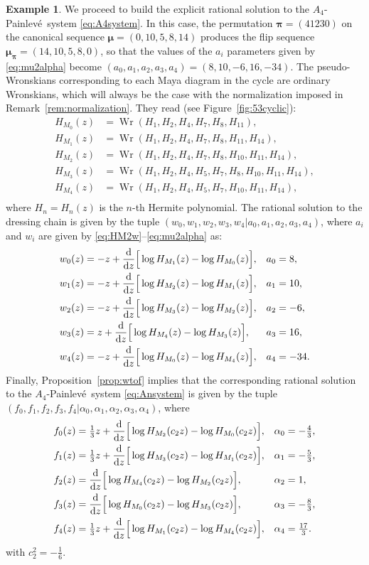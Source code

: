 \documentclass[10pt]{amsart}
\theoremstyle{definition}
\newtheorem{example}[thm]{Example}
\numberwithin{equation}{section}
\numberwithin{figure}{section}
\newcommand{\Wr}{\operatorname{Wr}}
\newcommand{\bmu}{{\boldsymbol{\mu}}}
\newcommand{\bpi}{{\boldsymbol{\pi}}}
\renewcommand{\H}{H}%
\newcommand{\ddz}{\frac{{\rm d}}{{\rm d}z}}
\newcommand{\p}{Painlev\'{e}}
\renewcommand{\a}{\alpha}
\newcommand{\cc}[1]{c_{#1}}
\begin{document}
\begin{example}
We proceed to build the explicit rational solution to the $A_4$-\p\ system \eqref{eq:A4system}. In this case, the permutation $\bpi=(41230)$ on the canonical sequence $\bmu=(0,10,5,8,14)$ produces the flip sequence $\bmu_\bpi=(14,10,5,8,0)$, so that the values of the $a_i$ parameters given by \eqref{eq:mu2alpha} become %
$(a_0,a_1,a_2,a_3,a_4)=(8,10,-6,16,-34)$.
The pseudo-Wronskians corresponding to each Maya diagram in the cycle are ordinary Wronskians, which will always be the case with the normalization imposed in Remark~\ref{rem:normalization}. They read (see Figure~\ref{fig:53cyclic}):
\begin{align*}
\H_{M_0}(z)&=\Wr(H_1,H_2,H_4,H_7,H_8,H_{11}),\\
\H_{M_1}(z)&=\Wr(H_1,H_2,H_4,H_7,H_8,H_{11},H_{14}),\\
\H_{M_2}(z)&=\Wr(H_1,H_2,H_4,H_7,H_8,H_{10},H_{11},H_{14}),\\
\H_{M_3}(z)&=\Wr(H_1,H_2,H_4,H_5,H_7,H_8,H_{10},H_{11},H_{14}),\\
\H_{M_4}(z)&=\Wr(H_1,H_2,H_4,H_5,H_7,H_{10},H_{11},H_{14}),\\
\end{align*}
where $H_n=H_n(z)$ is the $n$-th Hermite polynomial. The rational solution to the dressing chain is given by the tuple $(w_0,w_1,w_2,w_3,w_4|a_0,a_1,a_2,a_3,a_4)$, where $a_i$ and $w_i$ are given by \eqref{eq:HM2w}--\eqref{eq:mu2alpha} as:
\begin{align*}
w_0(z)&=-z+\ddz\Big[\log \H_{M_1}(z) - \log \H_{M_0}(z)\Big],&& a_0=8,\\
w_1(z)&=-z+ \ddz\Big[\log \H_{M_2}(z)-\log \H_{M_1}(z)\Big],&& a_1=10,\\
w_2(z)&=-z+ \ddz\Big[\log \H_{M_3}(z) - \log \H_{M_2}(z)\Big],&& a_2=-6,\\
w_3(z)&=z+ \ddz\Big[\log \H_{M_4}(z) - \log \H_{M_3}(z)\Big],&& a_3=16,\\
w_4(z)&=-z+ \ddz\Big[\log \H_{M_0}(z) - \log \H_{M_4}(z)\Big],&& a_4=-34.
\end{align*}
Finally, Proposition~\ref{prop:wtof} implies that the corresponding rational solution to the $A_4$-\p\ system \eqref{eq:Ansystem} is given by the tuple $(f_0,f_1,f_2,f_3,f_4|\a_0,\a_1,\a_2,\a_3,\a_4)$, where
\begin{align*}
f_0(z)&=\tfrac13z+\ddz\Big[\log \H_{M_2}(\cc{2}z) - \log \H_{M_0}(\cc{2}z)\Big],&& \alpha_0=-\tfrac43,\\
f_1(z)&=\tfrac13z+\ddz\Big[\log \H_{M_3}(\cc{2}z) -\log \H_{M_1}(\cc{2}z)\Big],&& \alpha_1=-\tfrac53,\\
f_2(z)&= \ddz\Big[\log \H_{M_4}(\cc{2}z) - \log \H_{M_2}(\cc{2}z)\Big],&& \alpha_2=1,\\
f_3(z)&=\ddz\Big[\log \H_{M_0}(\cc{2}z) -\log \H_{M_3}(\cc{2}z)\Big],&& \alpha_3=-\tfrac83,\\
f_4(z)&=\tfrac13z+\ddz\Big[\log \H_{M_1}(\cc{2}z) - \log \H_{M_4}(\cc{2}z)\Big],&& \alpha_4=\tfrac{17}{3}.
\end{align*}
with $\cc{2}^2=-\tfrac16$.
\end{example}
\end{document}

